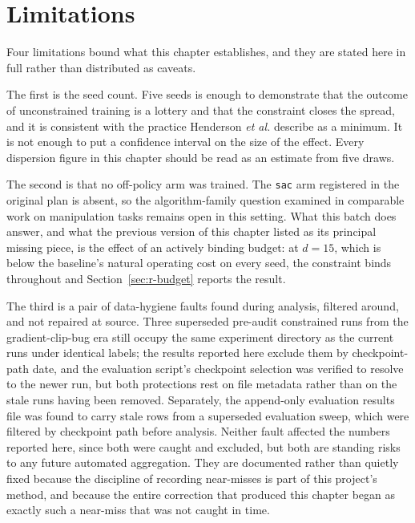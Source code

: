 \section{Limitations}\label{sec:r-limits}

Four limitations bound what this chapter establishes, and they are stated here in full rather
than distributed as caveats.

The first is the seed count. Five seeds is enough to demonstrate that the outcome of
unconstrained training is a lottery and that the constraint closes the spread, and it is
consistent with the practice Henderson \emph{et al.} \cite{henderson2018matters} describe as a
minimum. It is not enough to put a confidence interval on the size of the effect. Every
dispersion figure in this chapter should be read as an estimate from five draws.

The second is that no off-policy arm was trained. The \texttt{sac} arm registered in the original
plan is absent, so the algorithm-family question examined in comparable work on manipulation
tasks \cite{shahid2022continuous_grasping} remains open in this setting. What this batch does
answer, and what the previous version of this chapter listed as its principal missing piece, is
the effect of an actively binding budget: at \(d=15\), which is below the baseline's natural
operating cost on every seed, the constraint binds throughout and Section~\ref{sec:r-budget}
reports the result.

The third is a pair of data-hygiene faults found during analysis, filtered around, and not
repaired at source. Three superseded pre-audit constrained runs from the gradient-clip-bug era
still occupy the same experiment directory as the current runs under identical labels; the
results reported here exclude them by checkpoint-path date, and the evaluation script's
checkpoint selection was verified to resolve to the newer run, but both protections rest on file
metadata rather than on the stale runs having been removed. Separately, the append-only
evaluation results file was found to carry stale rows from a superseded evaluation sweep, which
were filtered by checkpoint path before analysis. Neither fault affected the numbers reported
here, since both were caught and excluded, but both are standing risks to any future automated
aggregation. They are documented rather than quietly fixed because the discipline of recording
near-misses is part of this project's method, and because the entire correction that produced
this chapter began as exactly such a near-miss that was not caught in time.


